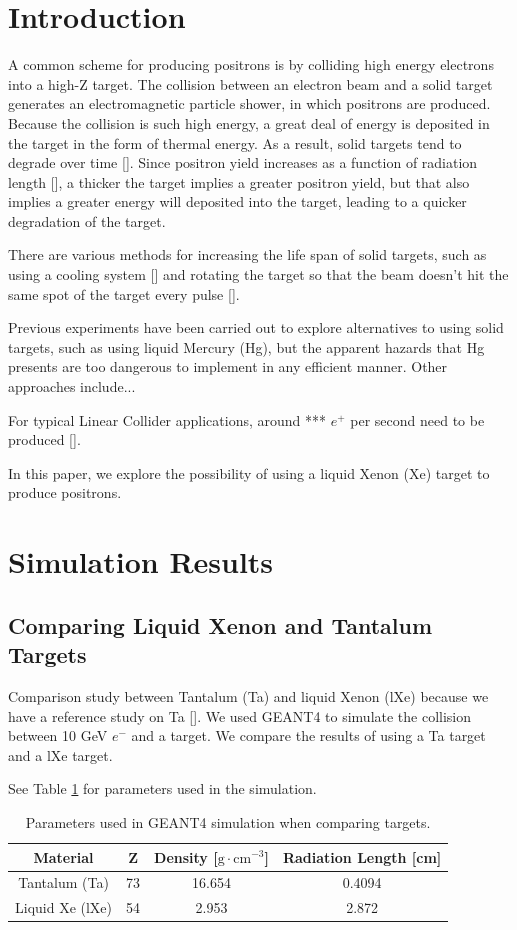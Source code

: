 \documentclass[%
reprint,
amsmath, amssymb,
aps,
floatfix,
]{revtex4-2}
\begin{document}

\section{Introduction}
A common scheme for producing positrons is by colliding high energy electrons into a high-Z target.
The collision between an electron beam and a solid target generates an electromagnetic particle shower,
in which positrons are produced.
Because the collision is such high energy, a great deal of energy is deposited in the target in the form of
thermal energy.  As a result, solid targets tend to degrade over time [].  Since positron yield increases as a
function of radiation length [], a thicker the target implies a greater positron yield, but that also implies
a greater energy will deposited into the target, leading to a quicker degradation of the target.

There are various methods for increasing
the life span of solid targets, such as using a cooling system [] and rotating the target so that the beam doesn't
hit the same spot of the target every pulse [].

Previous experiments have been carried out to explore alternatives to using solid targets, such as using liquid Mercury (Hg),
but the apparent hazards that Hg presents are too dangerous to implement in any efficient manner.
Other approaches include...

For typical Linear Collider applications, around *** $e^+$ per second need to be produced [].

In this paper, we explore the possibility of using a liquid Xenon (Xe) target to produce positrons.

\section{Simulation Results}
\subsection{Comparing Liquid Xenon and Tantalum Targets}
Comparison study between Tantalum (Ta) and liquid Xenon (lXe) because we have a reference study on Ta [].
We used GEANT4 to simulate the collision between 10 GeV $e^-$ and a target.  We compare the results of using a
Ta target and a lXe target.

See Table \ref{tab:G4Params} for parameters used in the simulation.
\begin{table}[h]
    \centering
    \begin{tabular}{cccc}
        \hline \hline
        Material & Z & Density [$\textrm{g} \cdot \textrm{cm}^{-3} $] & Radiation Length [cm] \\
        \hline
        Tantalum (Ta) & 73 & 16.654 & 0.4094 \\
        Liquid Xe (lXe) & 54 & 2.953 & 2.872 \\
        \hline \hline
    \end{tabular}
    \caption{\label{tab:G4Params}Parameters used in GEANT4 simulation when comparing targets.}
\end{table}
\end{document}

